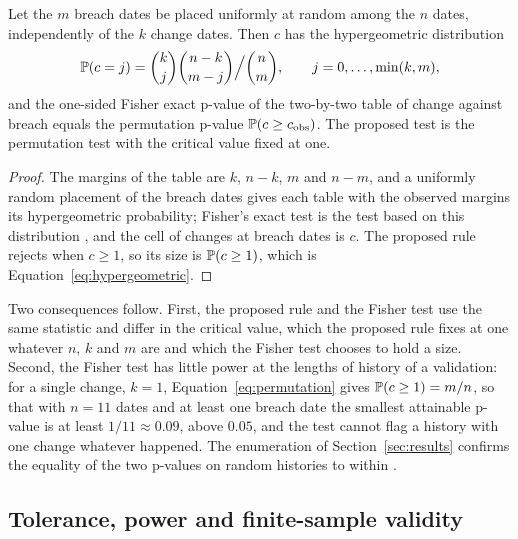 \begin{proposition}
\label{prop:association}
Let the $m$ breach dates be placed uniformly at random among the $n$ dates, independently of the $k$ change dates. Then $c$ has the hypergeometric distribution
\begin{equation}
\mathbb{P}(c=j)=\binom kj\binom{n-k}{m-j}\Big/\binom nm ,\qquad j=0,\dots,\min(k,m),
\label{eq:permutation}
\end{equation}
and the one-sided Fisher exact p-value of the two-by-two table of change against breach equals the permutation p-value $\mathbb{P}(c\ge c_{\mathrm{obs}})$. The proposed test is the permutation test with the critical value fixed at one.
\end{proposition}
\begin{proof}
The margins of the table are $k$, $n-k$, $m$ and $n-m$, and a uniformly random placement of the breach dates gives each table with the observed margins its hypergeometric probability; Fisher's exact test is the test based on this distribution \citep{fisher1935}, and the cell of changes at breach dates is $c$. The proposed rule rejects when $c\ge 1$, so its size is $\mathbb{P}(c\ge 1)$, which is Equation~\eqref{eq:hypergeometric}.
\end{proof}
Two consequences follow. First, the proposed rule and the Fisher test use the same statistic and differ in the critical value, which the proposed rule fixes at one whatever $n$, $k$ and $m$ are and which the Fisher test chooses to hold a size. Second, the Fisher test has little power at the lengths of history of a validation: for a single change, $k=1$, Equation~\eqref{eq:permutation} gives $\mathbb{P}(c\ge 1)=m/n$, so that with $n=11$ dates and at least one breach date the smallest attainable p-value is at least $1/11\approx 0.09$, above $0.05$, and the test cannot flag a history with one change whatever happened. The enumeration of Section~\ref{sec:results} confirms the equality of the two p-values on \fisherPermN{} random histories to within \fisherPermMax{}.

\subsection{Tolerance, power and finite-sample validity}
\label{sec:theory-tolerance}

